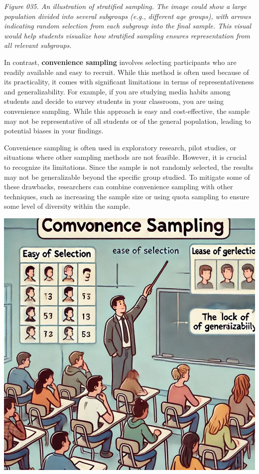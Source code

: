 \documentclass[
]{book}
\begin{document}
\emph{Figure 035. An illustration of stratified sampling. The image could show a large population divided into several subgroups (e.g., different age groups), with arrows indicating random selection from each subgroup into the final sample. This visual would help students visualize how stratified sampling ensures representation from all relevant subgroups.}

In contrast, \textbf{convenience sampling} involves selecting participants who are readily available and easy to recruit. While this method is often used because of its practicality, it comes with significant limitations in terms of representativeness and generalizability. For example, if you are studying media habits among students and decide to survey students in your classroom, you are using convenience sampling. While this approach is easy and cost-effective, the sample may not be representative of all students or of the general population, leading to potential biases in your findings.

Convenience sampling is often used in exploratory research, pilot studies, or situations where other sampling methods are not feasible. However, it is crucial to recognize its limitations. Since the sample is not randomly selected, the results may not be generalizable beyond the specific group studied. To mitigate some of these drawbacks, researchers can combine convenience sampling with other techniques, such as increasing the sample size or using quota sampling to ensure some level of diversity within the sample.

\includegraphics[width=1\textwidth,height=\textheight]{images/fig036.jpg}
\end{document}
